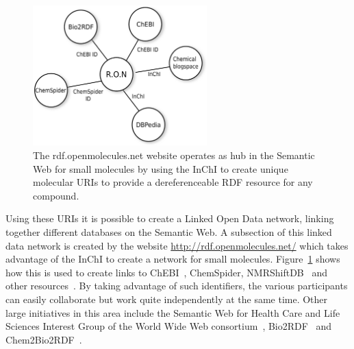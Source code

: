 \documentclass[11pt]{book}
\begin{document}
\begin{figure}[bt]
\begin{center}
\includegraphics[width=0.6\textwidth]{graphics/ons.pdf}
\end{center}
\caption{The rdf.openmolecules.net website operates as hub
in the Semantic Web for small molecules by using the InChI
to create unique molecular URIs to provide a dereferenceable
RDF resource for any compound.}
\label{fig:ons}
\end{figure}

Using these URIs it is possible to create a Linked Open Data
network, linking together different databases on the
Semantic Web. A subsection of this linked data network
is created by the website \url{http://rdf.openmolecules.net/}
which takes advantage of the InChI to create a network for
small molecules. Figure~\ref{fig:ons} shows how this is used
to create links to ChEBI~\cite{Degtyarenko2008}, ChemSpider,
NMRShiftDB~\cite{Steinbeck2003b} and other
resources~\cite{Willighagen2010jbiomedsem}. By taking
advantage of such identifiers, the various participants
can easily collaborate but work quite independently at the
same time. Other large initiatives in this area include
the Semantic Web for Health Care and Life Sciences Interest Group of the
World Wide Web consortium~\cite{hclsig},
Bio2RDF~\cite{Belleau2008} and Chem2Bio2RDF~\cite{Chen2010}.
\end{document}
